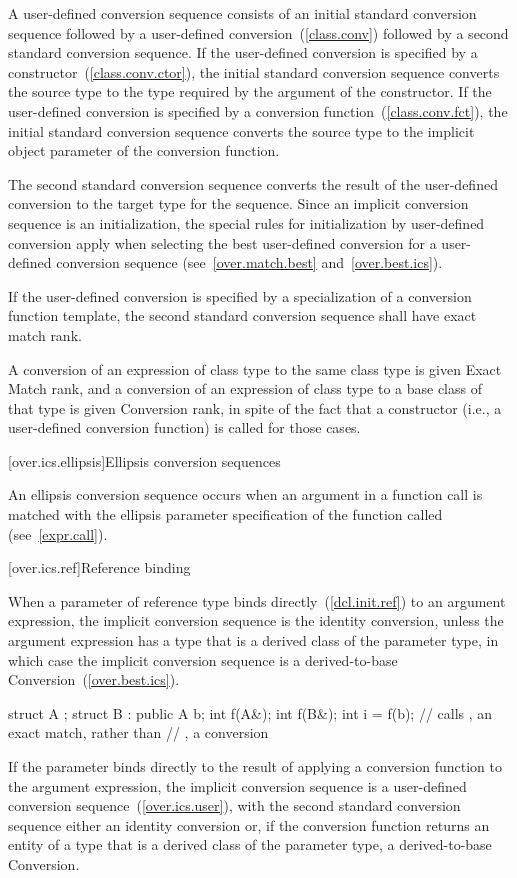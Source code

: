 \pnum
A user-defined conversion sequence consists of an initial
standard conversion sequence followed by a user-defined
conversion~(\ref{class.conv}) followed by a second standard
conversion sequence.
If the user-defined conversion is specified
by a constructor~(\ref{class.conv.ctor}), the initial standard
conversion sequence converts the source type to the type required
by the argument of the constructor.
If the user-defined
conversion is specified by a conversion function~(\ref{class.conv.fct}), the
initial standard conversion sequence
converts the source type to the implicit object parameter of the
conversion function.

\pnum
The second standard conversion sequence converts the result of
the user-defined conversion to the target type for the sequence.
Since an implicit conversion sequence is an initialization, the
special rules for initialization by user-defined conversion apply
when selecting the best user-defined conversion for a
user-defined conversion sequence (see~\ref{over.match.best} and~\ref{over.best.ics}).

\pnum
If the user-defined conversion is specified by a
specialization of a conversion function template,
the second standard conversion sequence shall have exact match rank.

\pnum
A conversion of an expression of class type
to the same class type is given Exact Match rank, and
a conversion of an expression of class type
to a base class of that type is given Conversion rank,
in spite of the
fact that a constructor (i.e., a user-defined conversion
function) is called for those cases.

[over.ics.ellipsis]{Ellipsis conversion sequences}

\pnum
{}%
An ellipsis conversion sequence occurs when an argument in a
function call is matched with the ellipsis parameter
specification of the function called (see~\ref{expr.call}).

[over.ics.ref]{Reference binding}

\pnum
When a parameter of reference type binds directly~(\ref{dcl.init.ref}) to an
argument expression, the implicit conversion sequence is the identity conversion,
unless the argument expression has a type that is a derived class of the parameter
type, in which case the implicit conversion sequence is a derived-to-base
Conversion~(\ref{over.best.ics}).
\enterexample

\begin{codeblock}
struct A {};
struct B : public A {} b;
int f(A&);
int f(B&);
int i = f(b);                   // calls , an exact match, rather than
                                // , a conversion
\end{codeblock}
\exitexample
If the parameter binds directly to the result of
applying a conversion function to the argument expression, the implicit
conversion sequence is a user-defined conversion sequence~(\ref{over.ics.user}),
with the second standard conversion sequence either an identity conversion or,
if the conversion function returns an entity of a type that is a derived class
of the parameter type, a derived-to-base Conversion.

